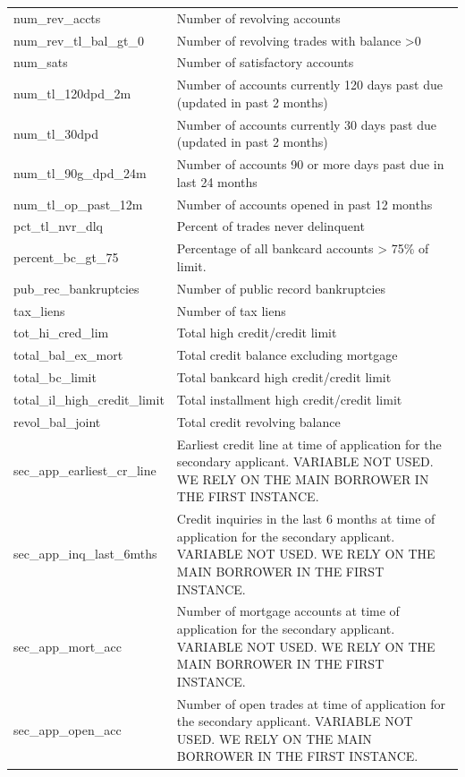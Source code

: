 \documentclass[11pt,]{report}
\begin{document}
\begin{longtable}[t]{>{\raggedright\arraybackslash}p{7cm}>{\raggedright\arraybackslash}p{7cm}}
\addlinespace
num\_rev\_accts & Number of revolving accounts\\
num\_rev\_tl\_bal\_gt\_0 & Number of revolving trades with balance >0\\
num\_sats & Number of satisfactory accounts\\
num\_tl\_120dpd\_2m & Number of accounts currently 120 days past due (updated in past 2 months)\\
num\_tl\_30dpd & Number of accounts currently 30 days past due (updated in past 2 months)\\
\addlinespace
num\_tl\_90g\_dpd\_24m & Number of accounts 90 or more days past due in last 24 months\\
num\_tl\_op\_past\_12m & Number of accounts opened in past 12 months\\
pct\_tl\_nvr\_dlq & Percent of trades never delinquent\\
percent\_bc\_gt\_75 & Percentage of all bankcard accounts > 75\% of limit.\\
pub\_rec\_bankruptcies & Number of public record bankruptcies\\
\addlinespace
tax\_liens & Number of tax liens\\
tot\_hi\_cred\_lim & Total high credit/credit limit\\
total\_bal\_ex\_mort & Total credit balance excluding mortgage\\
total\_bc\_limit & Total bankcard high credit/credit limit\\
total\_il\_high\_credit\_limit & Total installment high credit/credit limit\\
\addlinespace
revol\_bal\_joint & Total credit revolving balance\\
sec\_app\_earliest\_cr\_line & Earliest credit line at time of application for the secondary applicant. VARIABLE NOT USED. WE RELY ON THE MAIN BORROWER IN THE FIRST INSTANCE.\\
sec\_app\_inq\_last\_6mths & Credit inquiries in the last 6 months at time of application for the secondary applicant. VARIABLE NOT USED. WE RELY ON THE MAIN BORROWER IN THE FIRST INSTANCE.\\
sec\_app\_mort\_acc & Number of mortgage accounts at time of application for the secondary applicant. VARIABLE NOT USED. WE RELY ON THE MAIN BORROWER IN THE FIRST INSTANCE.\\
sec\_app\_open\_acc & Number of open trades at time of application for the secondary applicant. VARIABLE NOT USED. WE RELY ON THE MAIN BORROWER IN THE FIRST INSTANCE.\\

\end{longtable}
\end{document}
